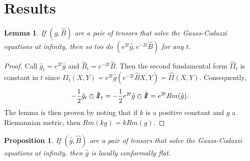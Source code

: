 \documentclass{amsart}
\newcommand{\two}{I\!\!I}
\newtheorem{lem}[thm]{Lemma}
\newtheorem{prop}[thm]{Proposition}
\begin{document}
\section{Results}

\begin{lem}
\label{scalings}
If $(\hat{g},\hat{B})$ are a pair of tensors that solve the Gauss-Codazzi equations at infinity, then so too do $(e^{2t}\hat{g},e^{-2t}\hat{B})$ for any $t$. 
\end{lem}

\begin{proof}
Call $\hat{g}_t = e^{2t}\hat{g}$ and $\hat{B}_t = e^{-2t}\hat{B}$.
Then the second fundamental form $\hat{\two}_t$ is constant in $t$ since $\hat{\two}_t(X,Y) = e^{2t}\hat{g}(e^{-2t}\hat{B}X,Y) = \hat{\two}(X,Y)$.
Consequently, 
\[
-\frac{1}{2}\hat{g}_t \owedge \hat{\two}_t 
= -\frac{1}{2}e^{2t}\hat{g}\owedge \hat{\two} 
= e^{2t}Rm(\hat{g}).
\]
The lemma is then proven by noting that if $k$ is a positive constant and $g$ a Riemannian metric, then $Rm(kg) = kRm(g)$.
\end{proof}

\begin{prop}
\label{GCInf-LCF}
If $(\hat{g},\hat{B})$ are a pair of tensors that solve the Gauss-Codazzi equations at infinity, then $\hat{g}$ is locally conformally flat. 
\end{prop}
\end{document}
